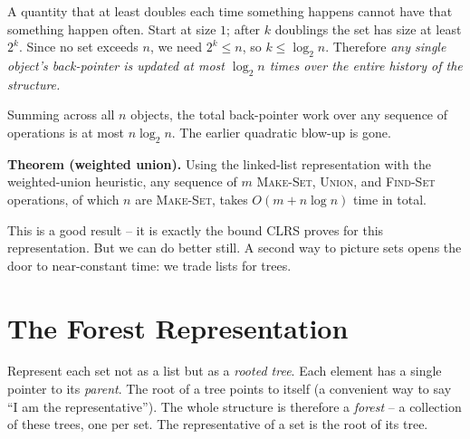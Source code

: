 \begin{intuitionbox}
A quantity that at least doubles each time something happens cannot have that
something happen often. Start at size $1$; after $k$ doublings the set has
size at least $2^k$. Since no set exceeds $n$, we need $2^k \le n$, so
$k \le \log_2 n$. Therefore \emph{any single object's back-pointer is updated
at most $\log_2 n$ times over the entire history of the structure.}
\end{intuitionbox}

Summing across all $n$ objects, the total back-pointer work over any sequence
of operations is at most $n \log_2 n$. The earlier quadratic blow-up is gone.

\begin{formalbox}
\textbf{Theorem (weighted union).} Using the linked-list representation with
the weighted-union heuristic, any sequence of $m$ \textsc{Make-Set},
\textsc{Union}, and \textsc{Find-Set} operations, of which $n$ are
\textsc{Make-Set}, takes $O(m + n \log n)$ time in total.
\end{formalbox}

This is a good result -- it is exactly the bound CLRS proves for this
representation. But we can do better still. A second way to picture sets opens
the door to near-constant time: we trade lists for trees.

\section{The Forest Representation}
\label{ch19:forest}

Represent each set not as
a list but as a \emph{rooted tree}. Each element has a single pointer to its
\emph{parent}. The root of a tree points to itself (a convenient way to say ``I
am the representative''). The whole structure is therefore a \emph{forest} -- a
collection of these trees, one per set. The representative of a set is the root
of its tree.

\begin{center}
\hspace{1.4cm}
\end{center}

